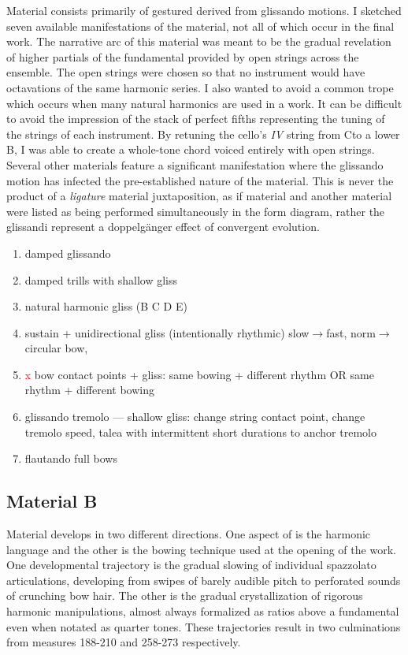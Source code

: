 Material  consists primarily of gestured derived from glissando motions. I sketched seven available manifestations of the material, not all of which occur in the final work. The narrative arc of this material was meant to be the gradual revelation of higher partials of the fundamental provided by open strings across the ensemble. The open strings were chosen so that no instrument would have octavations of the same harmonic series. I also wanted to avoid a common trope which occurs when many natural harmonics are used in a work. It can be difficult to avoid the impression of the stack of perfect fifths representing the tuning of the strings of each instrument. By retuning the cello's \textit{IV} string from C\mynatural \hspace{0.12cm}to a lower B\myflat, I was able to create a whole-tone chord voiced entirely with open strings. Several other materials feature a significant manifestation where the glissando motion has infected the pre-established nature of the material. This is never the product of a \textit{ligature} material juxtaposition, as if material  and another material were listed as being performed simultaneously in the form diagram, rather the glissandi represent a doppelgänger effect of convergent evolution.

\begin{enumerate}
\item damped glissando
\item damped trills with shallow gliss
\item natural harmonic gliss (B C D E)
\item sustain + unidirectional gliss (intentionally rhythmic) slow$\rightarrow$fast, norm$\rightarrow$circular bow, 
\item \textcolor{red}{x} bow contact points + gliss: same bowing + different rhythm OR same rhythm + different bowing
\item glissando tremolo — shallow gliss: change string contact point, change tremolo speed, talea with intermittent short durations to anchor tremolo
\item flautando full bows
\end{enumerate}

\subsection{Material B}

Material  develops in two different directions. One aspect of  is the harmonic language and the other is the bowing technique used at the opening of the work. One developmental trajectory is the gradual slowing of individual spazzolato articulations, developing from swipes of barely audible pitch to perforated sounds of crunching bow hair. The other is the gradual crystallization of rigorous harmonic manipulations, almost always formalized as ratios above a fundamental even when notated as quarter tones. These trajectories result in two culminations from measures 188-210 and 258-273 respectively.

